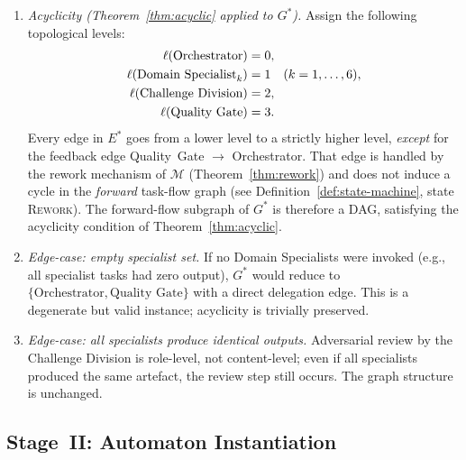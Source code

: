 \documentclass[12pt]{article}
\theoremstyle{definition}
\begin{document}
\begin{enumerate}
    \item[I.3] \emph{Acyclicity (Theorem~\ref{thm:acyclic} applied
               to $G^{*}$).}  Assign the following topological levels:
               \begin{align}
                   \ell(\text{Orchestrator})          &= 0, \notag\\
                   \ell(\text{Domain Specialist}_k)   &= 1
                   \quad (k = 1,\ldots,6), \notag\\
                   \ell(\text{Challenge Division})    &= 2, \notag\\
                   \ell(\text{Quality Gate})          &= 3. \notag
               \end{align}
               Every edge in $E^{*}$ goes from a lower level to a
               strictly higher level, \emph{except} for the feedback
               edge Quality~Gate $\to$ Orchestrator.  That edge is
               handled by the rework mechanism of $\mathcal{M}$
               (Theorem~\ref{thm:rework}) and does not induce a cycle
               in the \emph{forward} task-flow graph (see
               Definition~\ref{def:state-machine}, state \textsc{Rework}).
               The forward-flow subgraph of $G^{*}$ is therefore a
               DAG, satisfying the acyclicity condition of
               Theorem~\ref{thm:acyclic}. \checkmark

    \item[I.4] \emph{Edge-case: empty specialist set.}  If no
               Domain Specialists were invoked (e.g., all specialist
               tasks had zero output), $G^{*}$ would reduce to
               $\{\text{Orchestrator}, \text{Quality Gate}\}$ with a
               direct delegation edge.  This is a degenerate but valid
               instance; acyclicity is trivially preserved.

    \item[I.5] \emph{Edge-case: all specialists produce identical
               outputs.}  Adversarial review by the Challenge Division
               is role-level, not content-level; even if all specialists
               produced the same artefact, the review step still occurs.
               The graph structure is unchanged.
\end{enumerate}

\subsection{Stage~II: Automaton Instantiation}
\label{sec:case-study-automaton}
\end{document}
